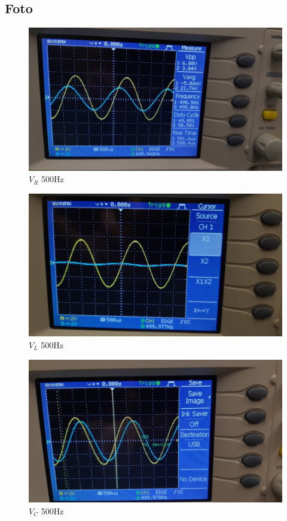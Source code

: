 \documentclass[12pt]{article}
\begin{document}
   \vskip 1cm 
   \subsection{Foto}
    \begin{figure}[!h]
        \centering
        \includegraphics[scale=0.2]{media/f1vr.jpg}
        \caption{$V_R$ 500Hz}
    \end{figure}
    \begin{figure}[!h]
        \centering
        \includegraphics[scale=0.2]{media/f1vl.jpg}
        \caption{$V_L$ 500Hz}
    \end{figure}
    \begin{figure}[!h]
        \centering
        \includegraphics[scale=0.2]{media/f1vc.jpg}
        \caption{$V_C$ 500Hz}
    \end{figure}
\end{document}

